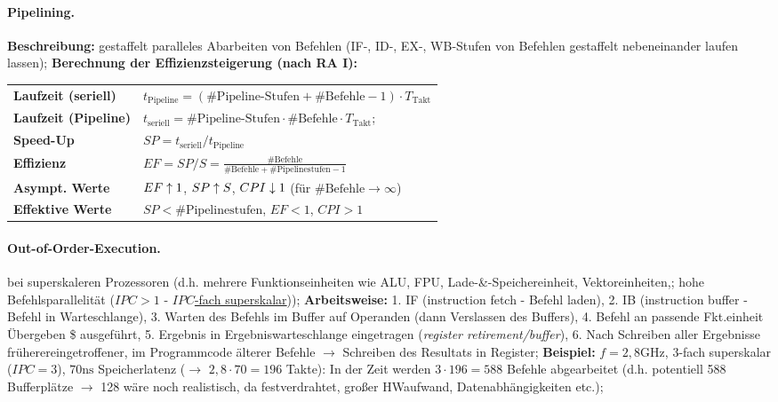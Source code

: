 \documentclass[8pt,a4paper]{article}
\begin{document}
\begin{multicols}{2}
\paragraph{Pipelining.} \textbf{Beschreibung:}  gestaffelt paralleles
Abarbeiten von Befehlen (IF-, ID-, EX-, WB-Stufen von Befehlen
gestaffelt nebeneinander laufen lassen); \textbf{Berechnung der Effizienzsteigerung (nach RA I):}                                      \\
\begin{tabular}{|ll|}
\hline
\textbf{Laufzeit (seriell)}  & $t_{\text{Pipeline}}=(\#\text{Pipeline-Stufen}+\#\text{Befehle}-1)\cdot T_{\text{Takt}}$ \\
\textbf{Laufzeit (Pipeline)} & $t_{\text{seriell}}=\#\text{Pipeline-Stufen}\cdot\#\text{Befehle}\cdot T_{\text{Takt}}$; \\
\textbf{Speed-Up}            & $SP=t_{\text{seriell}}/t_{\text{Pipeline}}$                                              \\
\textbf{Effizienz}           & $EF=SP/S=\frac{\#\text{Befehle}}{\#\text{Befehle}+\#\text{Pipelinestufen}-1}$            \\
\hline
\textbf{Asympt. Werte}       & $EF\uparrow 1$, $SP\uparrow S$, $CPI\downarrow 1$ (für $\#\text{Befehle}\to\infty$)               \\
\textbf{Effektive Werte}     & $SP<\#\text{Pipelinestufen}$, $EF<1$, $CPI>1$                                            \\
\hline
\end{tabular}

\paragraph{Out-of-Order-Execution.} bei superskaleren Prozessoren (d.h. mehrere Funktionseinheiten wie ALU, FPU, Lade-\&-Speichereinheit, Vektoreinheiten,; hohe Befehlsparallelität ($IPC>1$ - \underline{$IPC$-fach superskalar})); \textbf{Arbeitsweise:} 1. IF (instruction fetch - Befehl laden), 2. IB (instruction buffer - Befehl in Warteschlange), 3. Warten des Befehls im Buffer auf Operanden (dann Verslassen des Buffers), 4. Befehl an passende Fkt.einheit Übergeben \$ ausgeführt, 5. Ergebnis in Ergebniswarteschlange eingetragen (\emph{register retirement/buffer}), 6. Nach Schreiben aller Ergebnisse früherereingetroffener, im Programmcode älterer Befehle $\rightarrow$ Schreiben des Resultats in Register; \textbf{Beispiel:} $f=2,8\text{GHz}$, $3$-fach superskalar ($IPC=3$), $70\text{ns}$ Speicherlatenz ($\rightarrow$ $2,8\cdot 70=196$ Takte): In der Zeit werden $3\cdot 196=588$ Befehle abgearbeitet (d.h. potentiell 588 Bufferplätze $\rightarrow$ 128 wäre noch realistisch, da festverdrahtet, großer HWaufwand, Datenabhängigkeiten etc.); 


\end{multicols}
\end{document}
